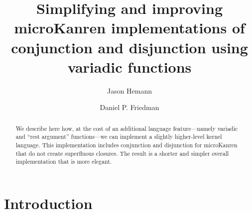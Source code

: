 \documentclass[sigplan,screen,draft,anonymous,review,natbib=false]{acmart}
\begin{document}
\title[Improving microKanren with Variadics]{Simplifying and improving microKanren implementations of
  conjunction and disjunction using variadic functions}

\author{Jason Hemann}
\author{Daniel P. Friedman}

\renewcommand{\shortauthors}{Hemann et al.}

\begin{abstract}
  We describe here how, at the cost of an additional language
  feature---namely variadic and \enquote{rest argument} functions---we
  can implement a slightly higher-level kernel language. This
  implementation includes conjunction and disjunction for microKanren
  that do not create superfluous closures. The result is a
  shorter and simpler overall implementation that is more elegant.
\end{abstract}


\keywords{}

\maketitle

\section{Introduction}
\end{document}
